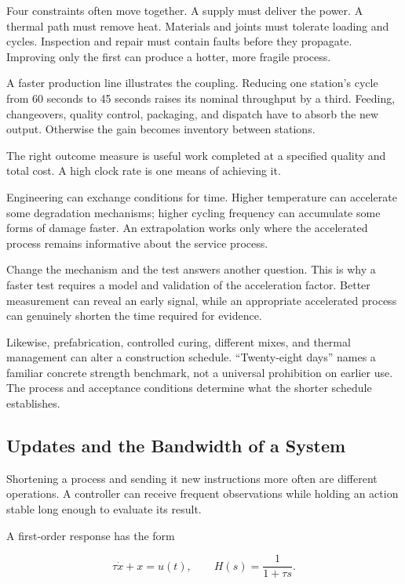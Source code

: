 Four constraints often move together. A supply must deliver the power. A thermal path must remove heat. Materials and joints must tolerate loading and cycles. Inspection and repair must contain faults before they propagate. Improving only the first can produce a hotter, more fragile process.

A faster production line illustrates the coupling. Reducing one station's cycle from 60 seconds to 45 seconds raises its nominal throughput by a third. Feeding, changeovers, quality control, packaging, and dispatch have to absorb the new output. Otherwise the gain becomes inventory between stations.

The right outcome measure is useful work completed at a specified quality and total cost. A high clock rate is one means of achieving it.


Engineering can exchange conditions for time. Higher temperature can accelerate some degradation mechanisms; higher cycling frequency can accumulate some forms of damage faster. An extrapolation works only where the accelerated process remains informative about the service process.

Change the mechanism and the test answers another question. This is why a faster test requires a model and validation of the acceleration factor. Better measurement can reveal an early signal, while an appropriate accelerated process can genuinely shorten the time required for evidence.

Likewise, prefabrication, controlled curing, different mixes, and thermal management can alter a construction schedule. “Twenty-eight days” names a familiar concrete strength benchmark, not a universal prohibition on earlier use. The process and acceptance conditions determine what the shorter schedule establishes.

\subsection{Updates and the Bandwidth of a System}

Shortening a process and sending it new instructions more often are different operations. A controller can receive frequent observations while holding an action stable long enough to evaluate its result.

A first-order response has the form

\begin{equation}
\tau\dot x+x=u(t),
\qquad
H(s)=\frac{1}{1+\tau s}.
\end{equation}

